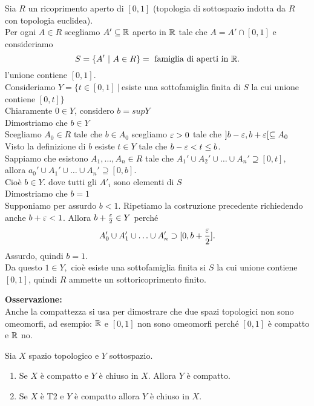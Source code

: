\documentclass[12px]{article}
\begin{document}
\begin{dimo}
	Sia $R$ un ricoprimento aperto di $[0,1]$ (topologia di sottospazio indotta da  $R$ con topologia euclidea).\\
	Per ogni $A\in R$ scegliamo $A'\subseteq \mathbb{R}$ aperto in  $\mathbb{R}$ tale che  $A = A'\cap [0,1]$ e consideriamo 
	 \[
		 S = \{A' \ | \ A\in R\} = \text{ famiglia di aperti in } \mathbb{R}
	.\] 
	l'unione contiene $[0,1]$.\\
	Consideriamo  $Y = \{t\in [0,1] \ | \ $esiste una sottofamiglia finita di $S$ la cui unione contiene $[0,t]\}$\\
	Chiaramente $0\in Y$, considero  $b = sup Y$\\
	Dimostriamo che $b\in Y$\\
	Scegliamo  $A_0\in R$ tale che $b\in A_0$ scegliamo $\varepsilon > 0 $ tale che $]b-\varepsilon,b + \varepsilon[\subseteq A_0$ \\
	Visto la definizione di $b$ esiste $t\in Y$ tale che $b - \varepsilon < t \leq b$.\\
	Sappiamo che esistono  $A_1,\ldots,A_n\in R$ tale che $A_1'\cup A_2'\cup\ldots\cup A_n'\supseteq [0,t],$  allora $a_0'\cup A_1'\cup\ldots\cup A_n'\supseteq [0,b]$.\\
	Cioè $b\in Y.$ dove tutti gli $A'_i$ sono elementi di  $S$\\
	Dimostriamo che  $b = 1$\\
	Supponiamo per assurdo  $b < 1$. Ripetiamo la costruzione precedente richiedendo anche $b + \varepsilon < 1$. Allora  $b + \frac {\varepsilon} 2\in Y$ perché
	\[
		A_0'\cup A_1'\cup\ldots\cup A_n'\supset [0,b + \frac {\varepsilon} 2]
	.\] 
	Assurdo, quindi $b = 1$.\\
	Da questo  $1\in Y, $ cioè esiste una sottofamiglia finita si  $S$ la cui unione contiene $[0,1]$, quindi $R$ ammette un sottoricoprimento finito. \\
\end{dimo}
\textbf{Osservazione:}\\
Anche la compattezza si usa per dimostrare che due spazi topologici non sono omeomorfi, ad esempio: $\mathbb{R}$ e $[0,1]$ non sono omeomorfi perché $[0,1]$ è compatto e $\mathbb{R} $ no.
\begin{prop}
	Sia $X$ spazio topologico  e $Y$ sottospazio. 
	\begin{enumerate}
		\item Se $X$ è compatto e $Y$ è chiuso in $X$. Allora  $Y$ è compatto.
		\item Se $X$ è T2 e $Y$ è compatto allora $Y$ è chiuso in $X$.
	\end{enumerate}
\end{prop}
\end{document}
